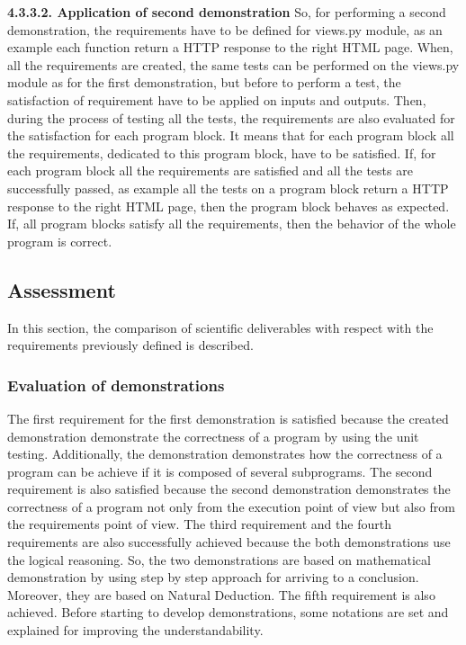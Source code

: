 \documentclass[conference,compsoc]{IEEEtran}
\begin{document}
\noindent
\newpage
\textbf{4.3.3.2. Application of second demonstration}
So, for performing a second demonstration, the requirements have to be defined for views.py module, as an example each function return a HTTP response to the right HTML page.
\newline
When, all the requirements are created, the same tests can be performed on the views.py module as for the first demonstration, but before to perform a test, the satisfaction of requirement have to be applied on inputs and outputs. 
\newline
Then, during the process of testing all the tests, the requirements are also evaluated for the satisfaction for each program block. It means that for each program block all the requirements, dedicated to this program block, have to be satisfied. If, for each program block all the requirements are satisfied and all the tests are successfully passed, as example all the tests on a program block return a HTTP response to the right HTML page, then the program block behaves as expected. 
\newline
If, all program blocks satisfy all the requirements, then the behavior of the whole program is correct. 
                                                                                                                                          
\subsection{Assessment}
In this section, the comparison of scientific deliverables with respect with the requirements previously defined is described. 

\subsubsection{Evaluation of demonstrations}
The first requirement for the first demonstration is satisfied because the created demonstration demonstrate the correctness of a program by using the unit testing. Additionally, the demonstration demonstrates how the correctness of a program can be achieve if it is composed of several subprograms. 
\newline
The second requirement is also satisfied because the second demonstration demonstrates the correctness of a program not only from the execution point of view but also from the requirements point of view. 
\newline
The third requirement and the fourth requirements are also successfully achieved because the both demonstrations use the logical reasoning. So, the two demonstrations are based on mathematical demonstration by using step by step approach for arriving to a conclusion. Moreover, they are based on Natural Deduction. 
\newline
The fifth requirement is also achieved. Before starting to develop demonstrations, some notations are set and explained for improving the understandability. 
\end{document}
